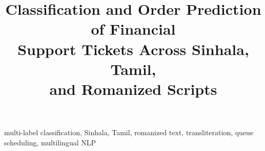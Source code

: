 \documentclass[conference,a4paper]{IEEEtran}
\newif\ifblind
\begin{document}
\title{Classification and Order Prediction of Financial\\Support Tickets Across Sinhala, Tamil,\\and Romanized Scripts}

\ifblind
  \author{\IEEEauthorblockN{Anonymous Submission}}
\else
  \author{
  }
\fi

\maketitle



\begin{IEEEkeywords}
multi-label classification, Sinhala, Tamil, romanized text,
transliteration, queue scheduling, multilingual NLP
\end{IEEEkeywords}














\end{document}
